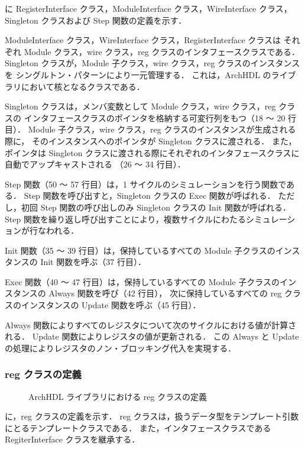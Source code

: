  に RegisterInterface クラス，ModuleInterface クラス，WireInterface クラス，
Singleton クラスおよび Step 関数の定義を示す．

ModuleInterface クラス，WireInterface クラス，RegisterInterface クラスは
それぞれ Module クラス，wire クラス，reg クラスのインタフェースクラスである．
Singleton クラスが，Module 子クラス，wire クラス，reg クラスのインスタンスを
シングルトン・パターンにより一元管理する．
これは，ArchHDL のライブラリにおいて核となるクラスである．

Singleton クラスは，メンバ変数として Module クラス，wire クラス，reg クラスの
インタフェースクラスのポインタを格納する可変行列をもつ（18 ～ 20 行目）．
Module 子クラス，wire クラス，reg クラスのインスタンスが生成される際に，
そのインスタンスへのポインタが Singleton クラスに渡される．
また，ポインタは Singleton クラスに渡される際にそれぞれのインタフェースクラスに自動でアップキャストされる
（26 ～ 34 行目）．

Step 関数（50 ～ 57 行目）は，1 サイクルのシミュレーションを行う関数である．
Step 関数を呼び出すと，Singleton クラスの Exec 関数が呼ばれる．
ただし，初回 Step 関数の呼び出しのみ Singleton クラスの Init 関数が呼ばれる．
Step 関数を繰り返し呼び出すことにより，複数サイクルにわたるシミュレーションが行なわれる．

Init 関数（35 ～ 39 行目）は，保持しているすべての Module 子クラスのインスタンスの Init 関数を呼ぶ（37 行目）．

Exec 関数（40 ～ 47 行目）は，保持しているすべての Module 子クラスのインスタンスの Always 関数を呼び（42 行目），
次に保持しているすべての reg クラスのインスタンスの Update 関数を呼ぶ（45 行目）．

Always 関数によりすべてのレジスタについて次のサイクルにおける値が計算される．
Update 関数によりレジスタの値が更新される．
この Always と Update の処理によりレジスタのノン・ブロッキング代入を実現する．


\subsubsection{reg クラスの定義}

\begin{figure}[t]
 
 \caption{ArchHDL ライブラリにおける reg クラスの定義}
 \label{src:reg}
\end{figure}

 に，reg クラスの定義を示す．
reg クラスは，扱うデータ型をテンプレート引数にとるテンプレートクラスである．
また，インタフェースクラスである RegiterInterface クラスを継承する．

